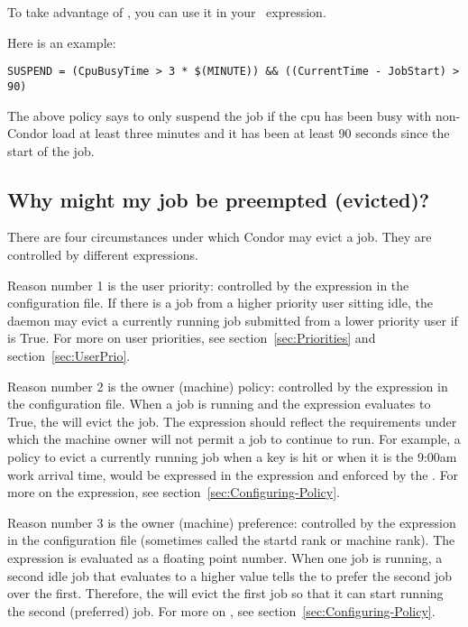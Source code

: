 To take advantage of , you can use it in your
\ expression. 

Here is an example:
\begin{verbatim}
SUSPEND = (CpuBusyTime > 3 * $(MINUTE)) && ((CurrentTime - JobStart) > 90)
\end{verbatim}

The above policy says to only suspend the job if the cpu has been busy
with non-Condor load at least three minutes and it has been at least 90
seconds since the start of the job.


\subsection*{Why might my job be preempted (evicted)?}

There are four circumstances under which Condor may evict a job.
They are controlled by different expressions.

Reason number 1 is the user priority:
controlled by the 
expression in the configuration file.
If there is a job from a 
higher priority user sitting idle,
the  daemon may evict 
a currently running job submitted from a lower priority user if 
 is True.
For more on user priorities,
see section~\ref{sec:Priorities} and
section~\ref{sec:UserPrio}.

Reason number 2 is the owner (machine) policy:
controlled by the  expression in the configuration file.
When a job is running and the  expression
evaluates to True,
the  will evict the job.
The  expression should reflect 
the requirements under which the machine owner will not permit
a job to continue to run.
For example, a policy to evict a currently running job when a key is hit
or when it is the 9:00am work arrival time,
would be expressed in the  expression 
and enforced by the .
For more on the  expression,
see section~\ref{sec:Configuring-Policy}.

Reason number 3 is the owner (machine) preference:
controlled by the  expression in the 
configuration file (sometimes called the startd rank or machine rank).
The  expression is evaluated as a floating point number.
When one job is running, a second idle job that evaluates to a higher
 value 
tells the  to prefer the second job over the first.
Therefore, the  will evict the first 
job so that it can start running the second (preferred) job.
For more on ,
see section~\ref{sec:Configuring-Policy}.

